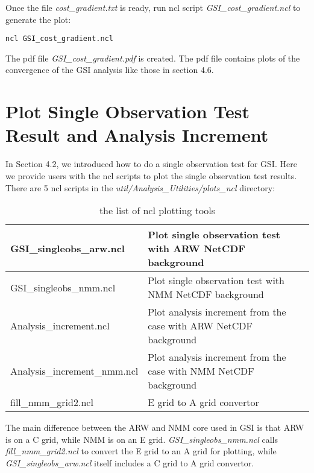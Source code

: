 Once the file \textit{cost\_gradient.txt} is ready, run ncl script \textit{GSI\_cost\_gradient.ncl} to generate the plot:
\begin{scriptsize}
\begin{verbatim}  
ncl GSI_cost_gradient.ncl
\end{verbatim}
\end{scriptsize}

The pdf file \textit{GSI\_cost\_gradient.pdf} is created. The pdf file contains plots of the convergence of the GSI analysis like those in section 4.6.

\section{Plot Single Observation Test Result and Analysis Increment}

In Section 4.2, we introduced how to do a single observation test for GSI. Here we provide users with the ncl scripts to plot the single observation test results.\\

There are 5 ncl scripts in the \textit{util/Analysis\_Utilities/plots\_ncl} directory:
\begin{table}[htbp]
\centering
\caption{the list of ncl plotting tools}
\begin{tabular}{|p{5cm}|p{9cm}|}
\hline
\hline
GSI\_singleobs\_arw.ncl&Plot single observation test with ARW NetCDF background\\
\hline
GSI\_singleobs\_nmm.ncl&Plot single observation test with NMM NetCDF background\\
\hline
Analysis\_increment.ncl&Plot analysis increment from the case with ARW NetCDF background\\
\hline
Analysis\_increment\_nmm.ncl&Plot analysis increment from the case with NMM NetCDF background\\
\hline
fill\_nmm\_grid2.ncl&	E grid to A grid convertor\\
\hline
\end{tabular}
\label{taba1}
\end{table} 

The main difference between the ARW and NMM core used in GSI is that ARW is on a C grid, while NMM is on an E grid. \textit{GSI\_singleobs\_nmm.ncl} calls \textit{fill\_nmm\_grid2.ncl} to convert the E grid to an A grid for plotting, while \textit{GSI\_singleobs\_arw.ncl} itself includes a C grid to A grid convertor.

